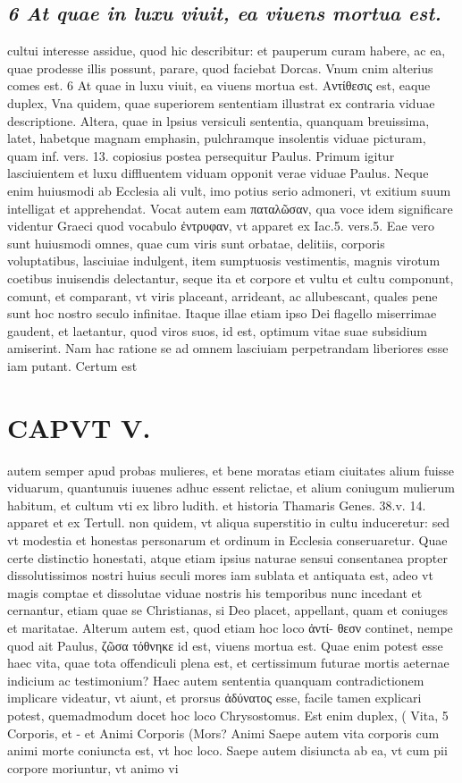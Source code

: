 \documentclass{article}
\begin{document}
\begin{pages}
\subsection*{\textit{6 At quae in luxu viuit, ea viuens mortua est.}}cultui interesse assidue, quod hic describitur: et pauperum curam habere, ac ea, quae prodesse illis possunt, parare, quod faciebat Dorcas. Vnum cnim alterius comes est. 6 At quae in luxu viuit, ea viuens mortua est. Αντίθεσις est, eaque duplex, Vna quidem, quae superiorem sententiam illustrat ex contraria viduae descriptione. Altera, quae in lpsius versiculi sententia, quanquam breuissima, latet, habetque magnam emphasin, pulchramque insolentis viduae picturam, quam inf. vers. 13. copiosius postea persequitur Paulus. Primum igitur lasciuientem et luxu diffluentem viduam opponit verae viduae Paulus. Neque enim huiusmodi ab Ecclesia ali vult, imo potius serio admoneri, vt exitium suum intelligat et apprehendat. Vocat autem eam παταλῶσαν, qua voce idem significare videntur Graeci quod vocabulo ἐντρυφαν, vt apparet ex Iac.5. vers.5. Eae vero sunt huiusmodi omnes, quae cum viris sunt orbatae, delitiis, corporis voluptatibus, lasciuiae indulgent, item sumptuosis vestimentis, magnis virotum coetibus inuisendis delectantur, seque ita et corpore et vultu et cultu componunt, comunt, et comparant, vt viris placeant, arrideant, ac allubescant, quales pene sunt hoc nostro seculo infinitae. Itaque illae etiam ipso Dei flagello miserrimae gaudent, et laetantur, quod viros suos, id est, optimum vitae suae subsidium amiserint. Nam hac ratione se ad omnem lasciuiam perpetrandam liberiores esse iam putant. Certum est  \pend
\section*{CAPVT V. }
\marginpar{[ p.263 ]}\pstart autem semper apud probas mulieres, et bene moratas etiam ciuitates alium fuisse viduarum, quantunuis iuuenes adhuc essent relictae, et alium coniugum mulierum habitum, et cultum vti ex libro ludith. et historia Thamaris Genes. 38.v. 14. apparet et ex Tertull. non quidem, vt aliqua superstitio in cultu induceretur: sed vt modestia et honestas personarum et ordinum in Ecclesia conseruaretur. Quae certe distinctio honestati, atque etiam ipsius naturae sensui consentanea propter dissolutissimos nostri huius seculi mores iam sublata et antiquata est, adeo vt magis comptae et dissolutae viduae nostris his temporibus nunc incedant et cernantur, etiam quae se Christianas, si Deo placet, appellant, quam et coniuges et maritatae. Alterum autem est, quod etiam hoc loco ἀντί- θεσν continet, nempe quod ait Paulus, ζῶσα τόθνηκε id est, viuens mortua est. Quae enim potest esse haec vita, quae tota offendiculi plena est, et certissimum futurae mortis aeternae indicium ac testimonium? Haec autem sententia quanquam contradictionem implicare videatur, vt aiunt, et prorsus ἀδύνατος esse, facile tamen explicari potest, quemadmodum docet hoc loco Chrysostomus. Est enim duplex, ( Vita, 5 Corporis, et - et Animi  Corporis (Mors? Animi Saepe autem vita corporis cum animi morte coniuncta est, vt hoc loco. Saepe autem disiuncta ab ea, vt cum pii corpore moriuntur, vt animo vi\pend

\end{pages}
\end{document}
